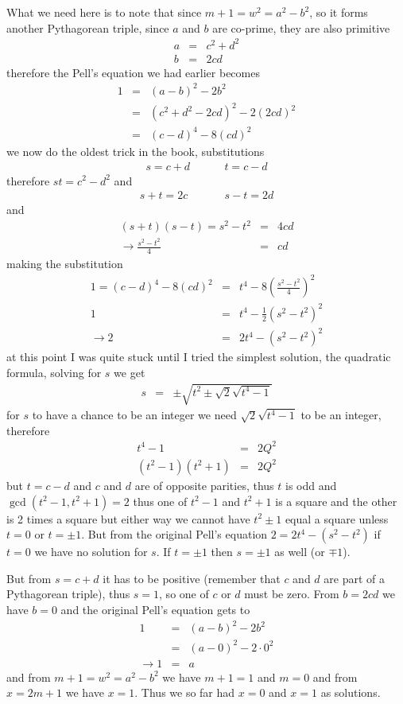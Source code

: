 \documentclass[aps,preprint,preprintnumbers,nofootinbib,showpacs,prd]{revtex4-1}
\newcommand{\nbea}{\begin{eqnarray*}}
\newcommand{\neea}{\end{eqnarray*}}
\begin{document}
What we need here is to note that since $m + 1 = w^2 = a^2 - b^2$, so it forms another Pythagorean triple, since $a$ and $b$ are co-prime, they are also primitive
%
\nbea
a & = & c^2 + d^2 \\
b & = & 2cd
\neea
%
therefore the Pell's equation we had earlier becomes
%
\nbea
1 & = & (a-b)^2 - 2b^2 \\
& = & (c^2 + d^2 - 2cd)^2 - 2(2cd)^2 \\
& = & (c-d)^4 - 8(cd)^2
\neea
%
we now do the oldest trick in the book, substitutions
%
\nbea
s = c + d ~~~~~~~~~~~~~~ t = c - d
\neea
%
therefore $st = c^2 - d^2$ and
%
\nbea
s + t = 2c ~~~~~~~~~~~~~~~ s - t = 2d
\neea
%
and
%
\nbea
(s + t)(s - t) = s^2 - t^2 & = & 4cd \\
\to \frac{s^2 - t^2}{4} & = & cd
\neea
%
making the substitution
%
\nbea
1 = (c-d)^4 - 8(cd)^2 & = & t^4 - 8\left(\frac{s^2 - t^2}{4}\right )^2 \\
1 & = &  t^4 - \frac{1}{2}\left(s^2 - t^2\right )^2 \\
\to 2 & = & 2t^4 - \left(s^2 - t^2\right )^2
\neea
%
at this point I was quite stuck until I tried the simplest solution, the quadratic formula, solving for $s$ we get
%
\nbea
s & = & \pm \sqrt{t^2 \pm\sqrt{2}\sqrt{t^4 - 1}}
\neea
%
for $s$ to have a chance to be an integer we need $\sqrt{2}\sqrt{t^4 - 1}$ to be an integer, therefore
%
\nbea
t^4 - 1 & = & 2Q^2 \\
(t^2 - 1)(t^2 + 1) & = & 2Q^2
\neea
%
but $t = c - d$ and $c$ and $d$ are of opposite parities, thus $t$ is odd and $\gcd(t^2 - 1, t^2 + 1) = 2$ thus one of $t^2 - 1$ and $t^2 + 1$ is a square and the other is 2 times a square but either way we cannot have $t^2 \pm 1$ equal a square unless $t = 0$ or $t = \pm1$. But from the original Pell's equation $2 = 2t^4 - (s^2 - t^2)$ if $t = 0$ we have no solution for $s$. If $t=\pm1$ then $s = \pm1$ as well (or $\mp 1$).

But from $s = c + d$ it has to be positive (remember that $c$ and $d$ are part of a Pythagorean triple), thus $s = 1$, so one of $c$ or $d$ must be zero. From $b = 2cd$ we have $b = 0$ and the original Pell's equation gets to
%
\nbea
1 & = & (a - b)^2 - 2b^2 \\
& = & (a - 0)^2 - 2 \cdot 0^2 \\
\to 1 & = & a
\neea
%
and from $m + 1 = w^2 = a^2 - b^2$ we have $m + 1 = 1$ and $m = 0$ and from $x = 2m + 1$ we have $x = 1$. Thus we so far had $x = 0$ and $x = 1$ as solutions.
\end{document}
